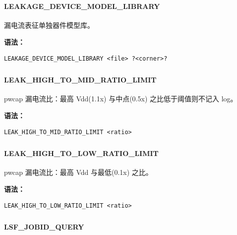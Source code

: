 \subsubsection{}
\paragraph*{LEAKAGE_DEVICE_MODEL_LIBRARY}

漏电流表征单独器件模型库。

\textbf{语法：}
\begin{lstlisting}
LEAKAGE_DEVICE_MODEL_LIBRARY <file> ?<corner>?
\end{lstlisting}

\subsubsection{}
\paragraph*{LEAK_HIGH_TO_MID_RATIO_LIMIT}

pwcap 漏电流比：最高 Vdd(1.1x) 与中点(0.5x) 之比低于阈值则不记入 log。

\textbf{语法：}
\begin{lstlisting}
LEAK_HIGH_TO_MID_RATIO_LIMIT <ratio>
\end{lstlisting}

\subsubsection{}
\paragraph*{LEAK_HIGH_TO_LOW_RATIO_LIMIT}

pwcap 漏电流比：最高 Vdd 与最低(0.1x) 之比。

\textbf{语法：}
\begin{lstlisting}
LEAK_HIGH_TO_LOW_RATIO_LIMIT <ratio>
\end{lstlisting}

\subsubsection{}
\paragraph*{LSF_JOBID_QUERY}

